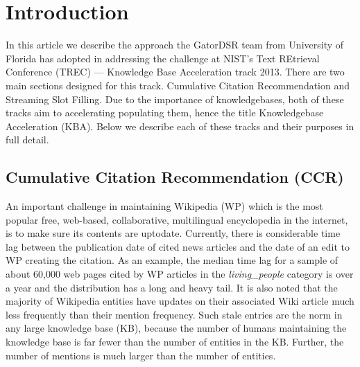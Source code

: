 
\section{Introduction}

In this article we describe the approach the GatorDSR team from 
University of Florida has adopted in addressing the challenge at NIST’s Text 
REtrieval Conference (TREC) --- Knowledge Base Acceleration track 2013. There are two main sections designed for this track. Cumulative Citation Recommendation and Streaming Slot Filling. Due to the importance of knowledgebases, both of these tracks aim to accelerating populating them, hence the title Knowledgebase Acceleration (KBA).
Below we describe each of these tracks and their purposes in full detail.

\subsection{Cumulative Citation Recommendation (CCR)}

An important challenge in maintaining Wikipedia (WP) which is the most popular free, web-based, collaborative, multilingual encyclopedia in the internet, is to make sure its contents are uptodate. Currently, there is considerable time lag between the publication date of cited news articles and the date of an edit to WP creating the citation. As an example, the median time lag for a sample of about 60,000 web pages cited by WP articles in the \textit{living\_people} category is over a year and the distribution has a long and heavy tail\cite{JFrank12}. It is also noted that the majority of Wikipedia entities have updates on their associated Wiki article much less frequently than their mention frequency. Such stale entries are the norm in any large knowledge base (KB), because the number of humans maintaining the knowledge base is far fewer than the number of entities in the KB. Further, the number of mentions is much larger than the number of entities\cite{JFrank12}. 

